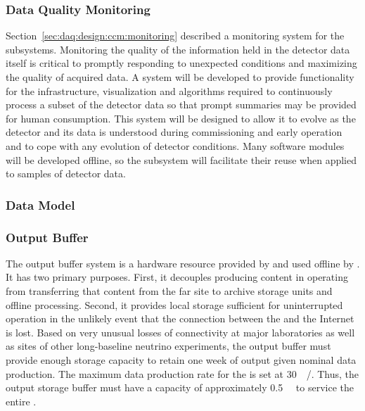 \subsubsection{Data Quality Monitoring}
\label{sec:fd-daq:design-data-quality}

Section~\ref{sec:daq:design:ccm:monitoring} described a monitoring system for the  subsystems. 
Monitoring the quality of the information held in the detector data itself is critical to promptly responding to unexpected conditions and maximizing the quality of acquired data. 
A   system will be developed to provide functionality for the infrastructure, visualization and algorithms required to continuously process a subset of the detector data so that prompt summaries may be provided for human consumption.
This system will be designed to allow it to evolve as the detector and its data is understood during commissioning and early operation and to cope with any evolution of detector conditions.
Many software modules will be developed offline, so the  subsystem will facilitate their reuse when applied to samples of detector data.


\subsubsection{Data Model}
\label{sec:fd-daq:design-data-model}


\subsubsection{Output Buffer}


The output buffer system is a hardware resource provided by  and used offline by . 
It has two primary purposes. 
First, it decouples producing content in operating  from transferring that content from the far site to archive storage units and offline processing. 
Second, it provides local storage sufficient for uninterrupted  operation in the unlikely event that the connection between the  and the Internet is lost. 
Based on very unusual losses of connectivity at major laboratories as well as  sites of other long-baseline neutrino experiments, the output buffer must provide enough storage capacity to retain one week of output given nominal data production. 
The maximum data production rate for the  is set at \SI{30}{\peta\byte/\year}. 
Thus, the output storage buffer must have a capacity of approximately \SI{0.5}{\peta\byte} to service the entire .


